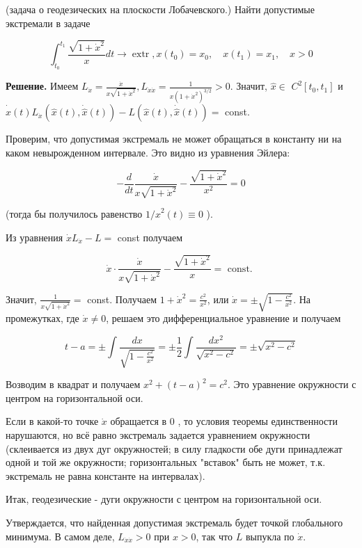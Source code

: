 \begin{task}
(задача о геодезических на плоскости Лобачевского.) Найти допустимые экстремали в задаче

$$
\int_{t_{0}}^{t_{1}} \frac{\sqrt{1+\dot{x}^{2}}}{x} d t \rightarrow \operatorname{extr}, x\left(t_{0}\right)=x_{0}, \quad x\left(t_{1}\right)=x_{1}, \quad x>0
$$

\textbf{Решение.} 
Имеем $L_{\dot{x}}=\frac{\dot{x}}{x \sqrt{1+\dot{x}^{2}}}, L_{\dot{x} \dot{x}}=\frac{1}{x\left(1+\dot{x}^{2}\right)^{3 / 2}}>0$. Значит, $\hat{x} \in$ $C^{2}\left[t_{0}, t_{1}\right]$ и $\dot{\hat{x}}(t) L_{\dot{x}}(\hat{x}(t), \dot{\hat{x}}(t))-L(\hat{x}(t), \dot{\hat{x}}(t))=$ const.

Проверим, что допустимая экстремаль не может обращаться в константу ни на каком невырожденном интервале. Это видно из уравнения Эйлера:

$$
-\frac{d}{d t} \frac{\dot{x}}{x \sqrt{1+\dot{x}^{2}}}-\frac{\sqrt{1+\dot{x}^{2}}}{x^{2}}=0
$$

(тогда бы получилось равенство $1 / \hat{x}^{2}(t) \equiv 0$ ).

Из уравнения $\dot{x} L_{\dot{x}}-L=$ const получаем

$$
\dot{x} \cdot \frac{\dot{x}}{x \sqrt{1+\dot{x}^{2}}}-\frac{\sqrt{1+\dot{x}^{2}}}{x}=\text { const. }
$$

Значит, $\frac{1}{x \sqrt{1+\dot{x}^{2}}}=$ const. Получаем $1+\dot{x}^{2}=\frac{c^{2}}{x^{2}}$, или $\dot{x}= \pm \sqrt{1-\frac{c^{2}}{x^{2}}}$. На промежутках, где $\dot{x} \neq 0$, решаем это дифференциальное уравнение и получаем

$$
t-a= \pm \int \frac{d x}{\sqrt{1-\frac{c^{2}}{x^{2}}}}= \pm \frac{1}{2} \int \frac{d x^{2}}{\sqrt{x^{2}-c^{2}}}= \pm \sqrt{x^{2}-c^{2}}
$$

Возводим в квадрат и получаем $x^{2}+(t-a)^{2}=c^{2}$. Это уравнение окружности с центром на горизонтальной оси.

Если в какой-то точке $\dot{x}$ обращается в 0 , то условия теоремы единственности нарушаются, но всё равно экстремаль задается уравнением окружности (склеивается из двух дуг окружностей; в силу гладкости обе дуги принадлежат одной и той же окружности; горизонтальных "вставок" быть не может, т.к. экстремаль не равна константе на интервалах).

Итак, геодезические - дуги окружности с центром на горизонтальной оси.

Утверждается, что найденная допустимая экстремаль будет точкой глобального минимума. В самом деле, $L_{\dot{x} \dot{x}}>0$ при $x>0$, так что $L$ выпукла по $\dot{x}$.

\end{task}